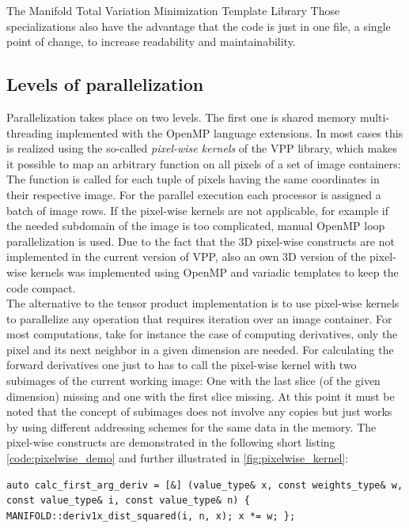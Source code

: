 \begin{chapter}{The Manifold Total Variation Minimization Template Library}
Those specializations also have the advantage that the code is just in one file, a single point of change, to increase readability and maintainability.


\subsection{Levels of parallelization} %
\label{sub:Levels of parallelization}
Parallelization takes place on two levels. The first one is shared memory multi-threading implemented with the OpenMP language extensions. In most cases this is realized 
using the so-called \textit{pixel-wise kernels} of the VPP library, which makes it possible to map an arbitrary function on all pixels of a set of image containers: The function is
called for each tuple of pixels having the same coordinates in their respective image. For the parallel execution each processor is assigned a batch of image rows.
If the pixel-wise kernels are not applicable, for example if the needed subdomain of the image is too complicated, manual OpenMP loop parallelization is used. Due to the fact that the 3D pixel-wise constructs are not 
implemented in the current version of VPP, also an own 3D version of the pixel-wise kernels 
was implemented using OpenMP and variadic templates to keep the code compact.\\

The alternative to the tensor product implementation is to use pixel-wise kernels to parallelize any operation that requires iteration over an image container.
For most computations, take for instance the case of computing derivatives, only the pixel and its next neighbor in a given dimension are needed. For calculating the forward derivatives one just 
to has to call the pixel-wise kernel with two subimages of the current working image: One with the last slice (of the given dimension) missing and one with the first slice missing. At this point it must be noted that the concept of subimages does not
involve any copies but just works by using different addressing schemes for the same
data in the memory.
The pixel-wise constructs are demonstrated in the following short listing \ref{code:pixelwise_demo} and further illustrated in \ref{fig:pixelwise_kernel}:\\

\cppinline
\begin{lstlisting}[label=code:pixelwise_demo,caption={Pixel-wise forward derivative computation}]
auto calc_first_arg_deriv = [&] (value_type& x, const weights_type& w, const value_type& i, const value_type& n) { MANIFOLD::deriv1x_dist_squared(i, n, x); x *= w; }; 


\end{lstlisting}
\end{chapter}

